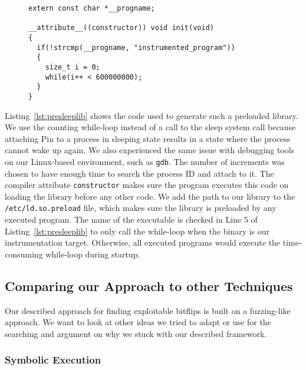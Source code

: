 \begin{figure}
\begin{minipage}{\linewidth}
\begin{lstlisting}[style=CStyle,
                   caption={Code of the preloaded library to keep the process
waiting for some milliseconds, which gives enough time for Pin to attach to the
process.},
label=lst:presleeplib]
extern const char *__progname;

__attribute__((constructor)) void init(void)
{
  if(!strcmp(__progname, "instrumented_program"))
  {
    size_t i = 0;
    while(i++ < 600000000);
  }
}
\end{lstlisting}
\end{minipage}
\end{figure}

Listing~\ref{lst:presleeplib} shows the code used to generate such a preloaded
library. We use the counting while-loop instead of a call to the sleep system
call because attaching Pin to a process in sleeping state results in a state
where the process cannot wake up again. We also experienced the same issue with
debugging tools on our Linux-based environment, such as \texttt{gdb}. The number
of increments was chosen to have enough time to search the process ID and attach
to it. The compiler attribute \texttt{constructor} makes sure the program
executes this code on loading the library before any other code. We add the path
to our library to the \texttt{/etc/ld.so.preload} file, which makes sure the
library is preloaded by any executed program. The name of the executable is
checked in Line 5 of Listing~\ref{lst:presleeplib} to only call the while-loop
when the binary is our instrumentation target. Otherwise, all executed programs
would execute the time-consuming while-loop during startup.

\subsection{Comparing our Approach to other Techniques}

Our described approach for finding exploitable bitflips is built on a
fuzzing-like approach. We want to look at other ideas we tried to adapt or use
for the searching and argument on why we stuck with our described framework.

\subsubsection{Symbolic Execution}

